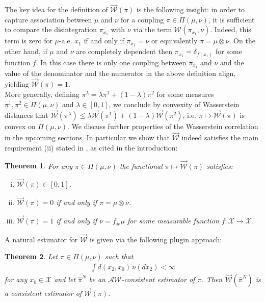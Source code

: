 \documentclass[10pt]{amsart}
\newtheorem{theorem}{Theorem}[section]
\begin{document}
The key idea for the definition of $\overrightarrow{\mathcal{W}}(\pi)$ is the following insight: in order to capture association between $\mu$ and $\nu$ for a coupling $\pi\in \Pi(\mu,\nu)$, it is sufficient to compare the disintegration $\pi_{x_1}$ with $\nu$ via the term $\mathcal{W}(\pi_{x_1},\nu)$. Indeed, this term is zero for $\mu$-a.e. $x_1$ if and only if $\pi_{x_1}=\nu$ or equivalently $\pi=\mu\otimes\nu$. On the other hand, if $\mu$ and $\nu$ are completely dependent then $\pi_{x_1}=\delta_{f(x_1)}$ for some function $f$. In this case there is only one coupling between $\pi_{x_1}$ and $\nu$ and the value of the denominator and the numerator in the above definition align, yielding $\overrightarrow{\mathcal{W}}(\pi)=1$.\\
More generally, defining $\pi^\lambda=\lambda\pi^1+(1-\lambda)\pi^2$ for some measures $\pi^1, \pi^2\in \Pi(\mu,\nu)$ and $\lambda\in [0,1]$, we conclude by convexity of Wasserstein distances  that $\overrightarrow{\mathcal{W}}(\pi^\lambda)\le \lambda \overrightarrow{\mathcal{W}}(\pi^1)+(1-\lambda)\overrightarrow{\mathcal{W}}(\pi^2)$, i.e. $\pi\mapsto \overrightarrow{\mathcal{W}}(\pi)$ is convex on $\Pi(\mu,\nu)$. We discuss further properties of the Wasserstein correlation in the upcoming sections. In particular we show that $\overrightarrow{\mathcal{W}}$ indeed satisfies the main requirement (ii) stated in \cite[Abstract]{chatterjee2020new}, as cited in the introduction:

\begin{theorem}\label{thm:easy}
For any $\pi\in \Pi(\mu,\nu)$ the functional $\pi\mapsto \overrightarrow{\mathcal{W}}(\pi)$ satisfies:
\begin{enumerate}[(i)]
\item $\overrightarrow{\mathcal{W}}(\pi)\in [0,1]$.
\item $\overrightarrow{\mathcal{W}}(\pi)=0$ if and only if $\pi=\mu\otimes\nu$.
\item  $\overrightarrow{\mathcal{W}}(\pi)=1$ if and only if $\nu=f_\#\mu$ for some measurable function $f:\mathcal{X}\to \mathcal{X}$.
\end{enumerate}
\end{theorem}

A natural estimator for $\overrightarrow{\mathcal{W}}$ is given via the following plugin approach:
\begin{theorem}
Let $\pi \in \Pi(\mu,\nu)$ such that 
\begin{align*}
\int d(x_2,x_0)\,\nu(dx_2) <\infty
\end{align*}
for any $x_0\in \mathcal{X}$ and let $\hat{\pi}^N$ be an $\mathcal{AW}$-consistent estimator of $\pi$. Then $\overrightarrow{\mathcal{W}}(\hat{\pi}^N)$ is a consistent estimator of $\overrightarrow{\mathcal{W}}(\pi)$.
\end{theorem}
\end{document}
